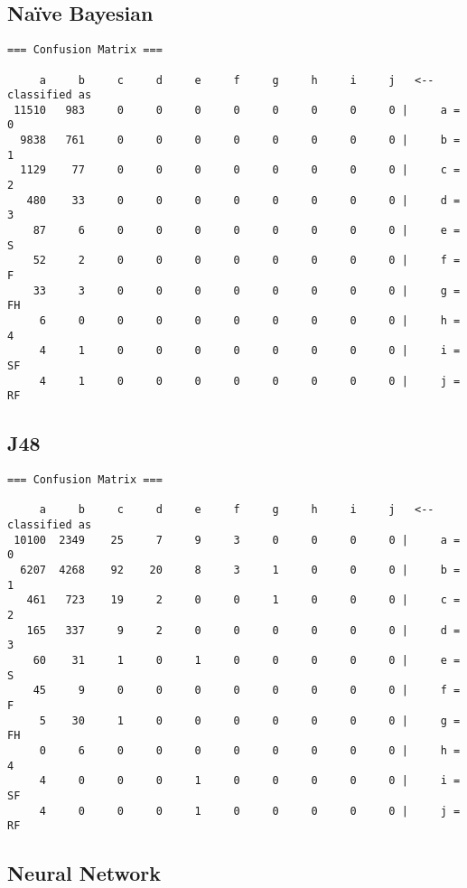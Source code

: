 \documentclass[10pt, a4paper]{article}
\begin{document}
\subsection*{Na\"ive Bayesian}

\begin{verbatim}
=== Confusion Matrix ===

     a     b     c     d     e     f     g     h     i     j   <-- classified as
 11510   983     0     0     0     0     0     0     0     0 |     a = 0
  9838   761     0     0     0     0     0     0     0     0 |     b = 1
  1129    77     0     0     0     0     0     0     0     0 |     c = 2
   480    33     0     0     0     0     0     0     0     0 |     d = 3
    87     6     0     0     0     0     0     0     0     0 |     e = S
    52     2     0     0     0     0     0     0     0     0 |     f = F
    33     3     0     0     0     0     0     0     0     0 |     g = FH
     6     0     0     0     0     0     0     0     0     0 |     h = 4
     4     1     0     0     0     0     0     0     0     0 |     i = SF
     4     1     0     0     0     0     0     0     0     0 |     j = RF
\end{verbatim}

\subsection*{J48}

\begin{verbatim}
=== Confusion Matrix ===

     a     b     c     d     e     f     g     h     i     j   <-- classified as
 10100  2349    25     7     9     3     0     0     0     0 |     a = 0
  6207  4268    92    20     8     3     1     0     0     0 |     b = 1
   461   723    19     2     0     0     1     0     0     0 |     c = 2
   165   337     9     2     0     0     0     0     0     0 |     d = 3
    60    31     1     0     1     0     0     0     0     0 |     e = S
    45     9     0     0     0     0     0     0     0     0 |     f = F
     5    30     1     0     0     0     0     0     0     0 |     g = FH
     0     6     0     0     0     0     0     0     0     0 |     h = 4
     4     0     0     0     1     0     0     0     0     0 |     i = SF
     4     0     0     0     1     0     0     0     0     0 |     j = RF
\end{verbatim}

\subsection*{Neural Network}
\end{document}
